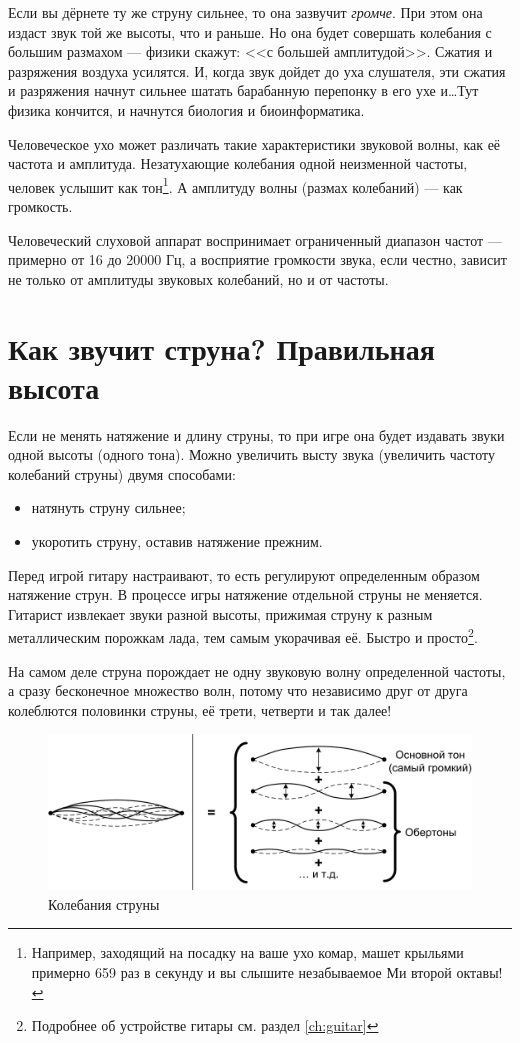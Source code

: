Если вы дёрнете ту же струну сильнее, то она зазвучит \emph{громче}. При этом она издаст звук той же высоты, что и раньше. Но она будет совершать колебания с большим размахом --- физики скажут: <<с большей амплитудой>>. Сжатия и разряжения воздуха усилятся. И, когда звук дойдет до уха слушателя, эти сжатия и разряжения начнут сильнее шатать барабанную перепонку в его ухе и\ldots Тут физика кончится, и начнутся биология и биоинформатика.

Человеческое ухо может различать такие характеристики звуковой волны, как её частота и амплитуда. Незатухающие колебания одной неизменной частоты, человек услышит как тон\footnote{Например, заходящий на посадку на ваше ухо комар, машет крыльями примерно 659 раз в секунду и вы слышите незабываемое Ми второй октавы!}. А амплитуду волны (размах колебаний) --- как громкость. 

Человеческий слуховой аппарат воспринимает ограниченный диапазон частот --- примерно от 16 до 20000 Гц, а восприятие громкости звука, если честно, зависит не только от амплитуды звуковых колебаний, но и от частоты. 


\section{Как звучит струна? Правильная высота}
\label{ch:music:tone}

Если не менять натяжение и длину струны, то при игре она будет издавать звуки одной высоты (одного тона). Можно увеличить высту звука (увеличить частоту колебаний струны) двумя способами:
\begin{itemize}
    \item натянуть струну сильнее;
    \item укоротить струну, оставив натяжение прежним.
\end{itemize}

Перед игрой гитару настраивают, то есть регулируют определенным образом натяжение струн. В процессе игры натяжение отдельной струны не меняется. Гитарист извлекает звуки разной высоты, прижимая струну к разным металлическим порожкам лада, тем самым укорачивая её. Быстро и просто\footnote{Подробнее об устройстве гитары см. раздел \ref{ch:guitar}}.

На самом деле струна порождает не одну звуковую волну определенной частоты, а сразу бесконечное множество волн, потому что независимо друг от друга колеблются половинки струны, её трети, четверти и так далее!

\begin{figure}[!ht]
    \centering
    \includegraphics[width=\textwidth]{fig/string-moving} 
    \caption{Колебания струны}\label{fig:music:tone:stringmoving}
\end{figure} 

